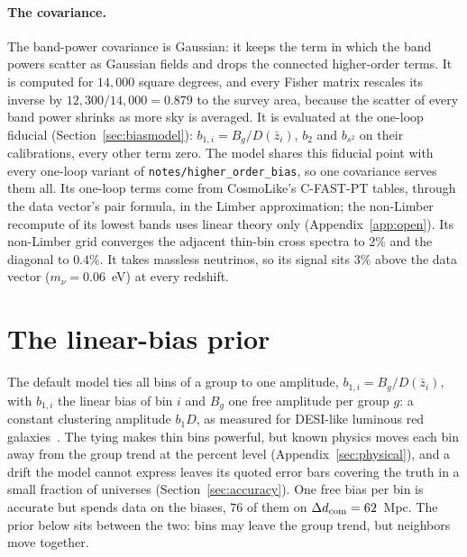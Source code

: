 \documentclass[11pt]{article}
\newcommand{\bstwo}{b_{s^2}}
\begin{document}
\paragraph{The covariance.}
The band-power covariance is Gaussian: it keeps the term in which the
band powers scatter as Gaussian fields and drops the connected
higher-order terms.  It is computed for $14{,}000$ square degrees,
and every Fisher matrix rescales its inverse by
$12{,}300/14{,}000 = 0.879$ to the survey area, because the scatter of
every band power shrinks as more sky is averaged.  It is evaluated at
the one-loop fiducial (Section~\ref{sec:biasmodel}):
$b_{1,i} = B_g/D(\bar{z}_i)$, $b_2$ and $\bstwo$ on their calibrations,
every other term zero.  The model shares this fiducial point with
every
one-loop variant of \texttt{notes/higher\_order\_bias}, so one
covariance serves them all.  Its one-loop terms come from CosmoLike's
C-FAST-PT tables, through the data vector's pair formula, in the
Limber approximation; the non-Limber recompute of its lowest bands
uses linear theory only (Appendix~\ref{app:open}).  Its non-Limber grid converges the adjacent
thin-bin cross spectra to $2\%$ and the diagonal to $0.4\%$.  It takes
massless neutrinos, so its signal sits $3\%$ above the data vector
($m_\nu = 0.06$~eV) at every redshift.

\section{The linear-bias prior}
\label{sec:prior}

The default model ties all bins of a group to one amplitude,
$b_{1,i} = B_g/D(\bar{z}_i)$, with $b_{1,i}$ the linear bias of bin $i$
and $B_g$ one free amplitude per group $g$: a constant clustering
amplitude $b_1 D$, as measured for DESI-like luminous red
galaxies~\cite{Zhou2021}.  The tying makes thin bins powerful, but
known physics moves each bin away from the group trend at the percent
level (Appendix~\ref{sec:physical}), and a drift the model cannot
express leaves its quoted error bars covering the truth in a small
fraction of universes (Section~\ref{sec:accuracy}).  One free bias per
bin is accurate but spends data on the biases, $76$ of them on
$\Delta d_{\rm com} = 62$~Mpc.  The prior below sits between the two:
bins may leave the group trend, but neighbors move together.
\end{document}
